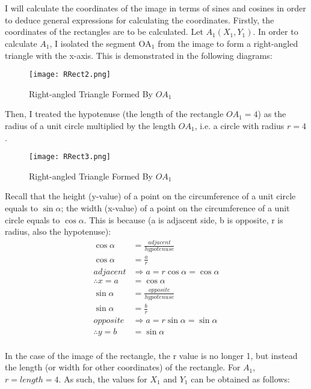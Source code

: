 \documentclass{article}
\begin{document}
    \\\\
    I will calculate the coordinates of the image in terms of sines and cosines in order to deduce general expressions for calculating the coordinates.
    \newpage
        Firstly, the coordinates of the rectangles are to be calculated. Let $A_1(X_1, Y_1)$. In order to calculate $A_1$, I isolated the segment $\mathrm{OA_1}$ from the image to form a right-angled triangle with the x-axis. This is demonstrated in the following diagrams:
        \begin{figure}[h!]
            \texttt{[image: RRect2.png]}
            \caption{Right-angled Triangle Formed By $OA_1$}
            \label{fig:rrect2}
        \end{figure} \newline
        Then, I treated the hypotenuse (the length of the rectangle $OA_1 = 4$) as the radius of a unit circle multiplied by the length $OA_1$, i.e. a circle with radius $r = 4$. \newpage
        \begin{figure}[h!]
            \texttt{[image: RRect3.png]}
            \caption{Right-angled Triangle Formed By $OA_1$}
            \label{fig:rrect3}
        \end{figure} 
        Recall that the height (y-value) of a point on the circumference of a unit circle equals to $\sin{\alpha}$; the width (x-value) of a point on the circumference of a unit circle equals to $\cos{\alpha}$. This is because (a is adjacent side, b is opposite, r is radius, also the hypotenuse):
        \begin{align*}
            \cos{\alpha} &= \frac{adjacent}{hypotenuse} \\
            \cos{\alpha} &= \frac{a}{r} \\
            adjacent &\Rightarrow a = r\cos{\alpha} = \cos{\alpha} \\
            \therefore x = a &= \cos{\alpha} \\
            \sin{\alpha} &= \frac{opposite}{hypotenuse} \\
            \sin{\alpha} &= \frac{b}{r} \\
            opposite &\Rightarrow a = r\sin{\alpha} = \sin{\alpha} \\
            \therefore y = b &= \sin{\alpha}
        \end{align*} \\
        In the case of the image of the rectangle, the r value is no longer 1, but instead the length (or width for other coordinates) of the rectangle. For $A_1$, $r = length = 4$. As such, the values for $X_1$ and $Y_1$ can be obtained as follows:
\end{document}
